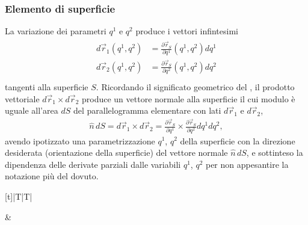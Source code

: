\documentclass[letterpaper,10pt,italian]{jupyterBook}
\begin{document}
\subsubsection{Elemento di superficie}
\label{\detokenize{ch/vector-calculus/geometry:elemento-di-superficie}}\label{\detokenize{ch/vector-calculus/geometry:vector-calculus-geometry-surfaces-infinitesimal}}
\sphinxAtStartPar
La variazione dei parametri \(q^1\) e \(q^2\) produce i vettori infintesimi
\begin{equation*}
\begin{split}\begin{aligned}
  d \vec{r}_1 (q^1,q^2) & = \frac{\partial \vec{r}_S}{\partial q^1}(q^1, q^2) d q^1 \\
  d \vec{r}_2 (q^1,q^2) & = \frac{\partial \vec{r}_S}{\partial q^2}(q^1, q^2) d q^2 \\
\end{aligned}\end{split}
\end{equation*}
\sphinxAtStartPar
tangenti alla superficie \(S\). Ricordando il significato geometrico del , il prodotto vettoriale \(d \vec{r}_1 \times d \vec{r}_2\) produce un vettore normale alla superficie il cui modulo è uguale all’area \(d S\) del parallelogramma elementare con lati \(d \vec{r}_1\) e \(d \vec{r}_2\),
\begin{equation*}
\begin{split}\hat{n} \, dS = d \vec{r}_1 \times d \vec{r}_2 = \frac{\partial \vec{r}_S}{\partial q^1} \times \frac{\partial \vec{r}_S}{\partial q^2} d q^1 d q^2 , \end{split}
\end{equation*}
\sphinxAtStartPar
avendo ipotizzato una parametrizzazione \(q^1\), \(q^2\) della superficie con la direzione desiderata (orientazione della superficie) del vettore normale \(\hat{n} \, dS\), e sottinteso la dipendenza delle derivate parziali dalle variabili \(q^1\), \(q^2\) per non appesantire la notazione più del dovuto.


\begin{savenotes}\sphinxattablestart
\centering
\begin{tabulary}{\linewidth}[t]{|T|T|}
\hline

\sphinxAtStartPar
{}
&
\sphinxAtStartPar
{}
\\
\hline
\end{tabulary}
\par
\sphinxattableend\end{savenotes}
\end{document}
